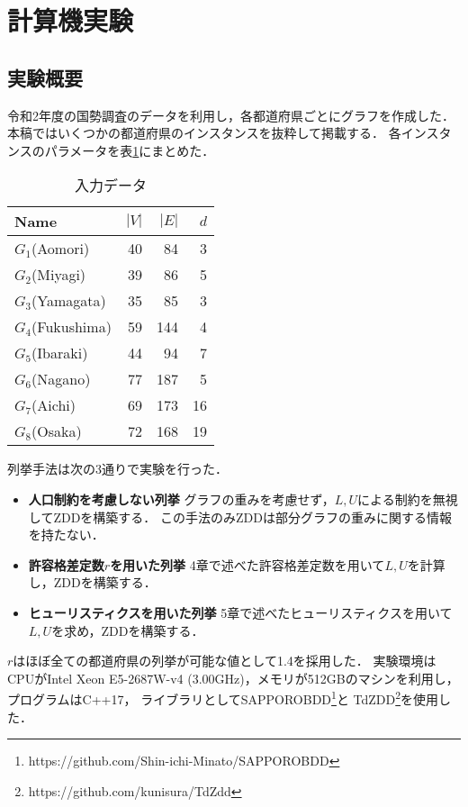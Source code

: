 \documentclass[10pt,a4paper,notitlepage,oneside,twocolumn]{abst_jsarticle}
\begin{document}
\section{計算機実験}
\subsection{実験概要}
令和2年度の国勢調査のデータを利用し，各都道府県ごとにグラフを作成した．
本稿ではいくつかの都道府県のインスタンスを抜粋して掲載する．
各インスタンスのパラメータを表\ref{table:input}にまとめた．

\begin{table}[htbp]
  \small
  \caption{入力データ}
  \label{table:input}
  \centering
  \begin{tabular}{l|rrr}
    \hline
    Name & $|V|$ & $|E|$ & $d$ \\
    \hline\hline
    $G_1$(Aomori) & 40 & 84 & 3 \\
    $G_2$(Miyagi) & 39 & 86 & 5 \\
    $G_3$(Yamagata) & 35 & 85 & 3 \\
    $G_4$(Fukushima) & 59 & 144 & 4 \\
    $G_5$(Ibaraki) & 44 & 94 & 7 \\
    $G_6$(Nagano) & 77 & 187 & 5 \\
    $G_7$(Aichi) & 69 & 173 & 16 \\
    $G_8$(Osaka) & 72 & 168 & 19 \\
    \hline
  \end{tabular}
\end{table}

列挙手法は次の3通りで実験を行った．
\begin{itemize}
  \item \textbf{人口制約を考慮しない列挙} グラフの重みを考慮せず，$L, U$による制約を無視してZDDを構築する．
  この手法のみZDDは部分グラフの重みに関する情報を持たない．
  \item \textbf{許容格差定数$r$を用いた列挙} 4章で述べた許容格差定数を用いて$L, U$を計算し，ZDDを構築する．
  \item \textbf{ヒューリスティクスを用いた列挙} 5章で述べたヒューリスティクスを用いて$L, U$を求め，ZDDを構築する．
\end{itemize}

$r$はほぼ全ての都道府県の列挙が可能な値として1.4を採用した．
実験環境はCPUがIntel Xeon E5-2687W-v4 (3.00GHz)，メモリが512GBのマシンを利用し，プログラムはC++17，
ライブラリとしてSAPPOROBDD\footnote{\scriptsize{https://github.com/Shin-ichi-Minato/SAPPOROBDD}}と
TdZDD\footnote{\scriptsize{https://github.com/kunisura/TdZdd}}を使用した．
\end{document}
